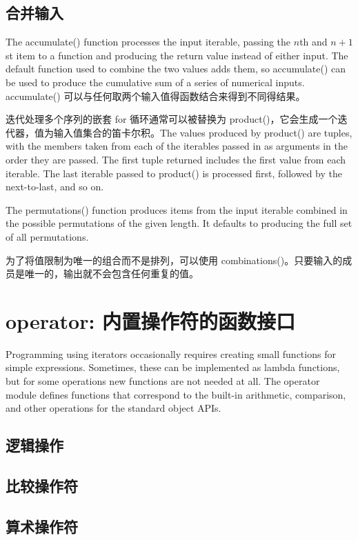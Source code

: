 \subsection{合并输入}
The accumulate() function processes the input iterable, passing the $n$th and $n+1$st item to a function and producing the return value instead of either input. The default function used to combine the two values adds them, so accumulate() can be used to produce the cumulative sum of a series of numerical inputs. accumulate() 可以与任何取两个输入值得函数结合来得到不同得结果。

迭代处理多个序列的嵌套 for 循环通常可以被替换为 product()，它会生成一个迭代器，值为输入值集合的笛卡尔积。The values produced by product() are tuples, with the members taken from each of the iterables passed in as arguments in the order they are passed. The first tuple returned includes the first value from each iterable. The last iterable passed to product() is processed first, followed by the next-to-last, and so on.

The permutations() function produces items from the input iterable combined in the possible permutations of the given length. It defaults to producing the full set of all permutations.

为了将值限制为唯一的组合而不是排列，可以使用 combinations()。只要输入的成员是唯一的，输出就不会包含任何重复的值。

\section{operator: 内置操作符的函数接口}
Programming using iterators occasionally requires creating small functions for simple expressions. Sometimes, these can be implemented as lambda functions, but for some operations new functions are not needed at all. The operator module defines functions that correspond to the built-in arithmetic, comparison, and other operations for the standard object APIs.
\subsection{逻辑操作}
\subsection{比较操作符}
\subsection{算术操作符}
